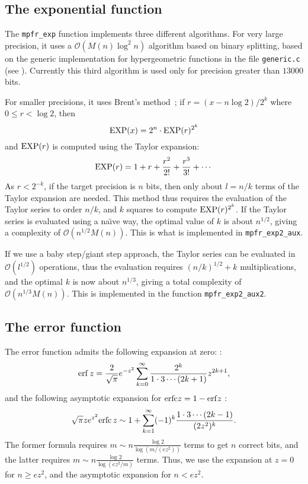 \documentclass[12pt]{amsart}
\def\O{{\mathcal O}}
\def\exp{{\rm EXP}}
\begin{document}
\subsection{The exponential function}

The {\tt mpfr\_exp} function implements three different algorithms.
For very large precision, it uses a $\O(M(n) \log^2 n)$ algorithm
based on binary splitting, based on the generic implementation for
hypergeometric functions in the file {\tt generic.c} (see \cite{Jeandel00}).
Currently this third algorithm is used only for precision greater
than $13000$ bits.

For smaller precisions, it uses Brent's method~;
if $r = (x - n \log 2)/2^k$ where $0 \le r < \log 2$, then 
\[ \exp(x) = 2^n \cdot \exp(r)^{2^k} \]
and $\exp(r)$ is computed using the Taylor expansion:
\[ \exp(r) =  1 + r + \frac{r^2}{2!} + \frac{r^3}{3!} + \cdots \]
As $r < 2^{-k}$, if the target precision is $n$ bits, then only
about $l = n/k$ terms of the Taylor expansion are needed.
This method thus requires the evaluation of the Taylor series to
order $n/k$, and $k$ squares to compute $\exp(r)^{2^k}$.
If the Taylor series is evaluated using a na\"{\i}ve way, the optimal
value of $k$ is about $n^{1/2}$, giving a complexity of $\O(n^{1/2} M(n))$.
This is what is implemented in {\tt mpfr\_exp2\_aux}.

If we use a baby step/giant step approach, the Taylor series
can be evaluated in $\O(l^{1/2})$ operations, 
thus the evaluation requires $(n/k)^{1/2} + k$ multiplications,
and the optimal $k$ is now about $n^{1/3}$,
giving a total complexity of $\O(n^{1/3} M(n))$.
This is implemented in the function {\tt mpfr\_exp2\_aux2}.

\subsection{The error function}

The error function admits the following expansion at zero:
\cite[formula 7.1.6]{AbSt73}:
\[ {\rm erf} \, z = \frac{2}{\sqrt{\pi}} e^{-z^2}
        \sum_{k=0}^{\infty} \frac{2^k}{1 \cdot 3 \cdots (2k+1)} z^{2k+1}, \]
and the following asymptotic expansion for ${\rm erfc} z = 1 - {\rm erf} z$
\cite[formula 7.1.23]{AbSt73}:
\[ \sqrt{\pi} z e^{z^2} {\rm erfc} \, z \sim 1 +
        \sum_{k=1}^{\infty} (-1)^k \frac{1 \cdot 3 \cdots (2k-1)}{(2z^2)^k}. \]
The former formula requires $m \sim n \frac{\log 2}{\log(m/(ez^2))}$ terms
to get $n$ correct bits, and the latter requires
$m \sim n \frac{\log 2}{\log(ez^2/m)}$ terms.
Thus, we use the expansion at $z=0$ for $n \ge e z^2$, and the asymptotic
expansion for $n < e z^2$.
\end{document}
